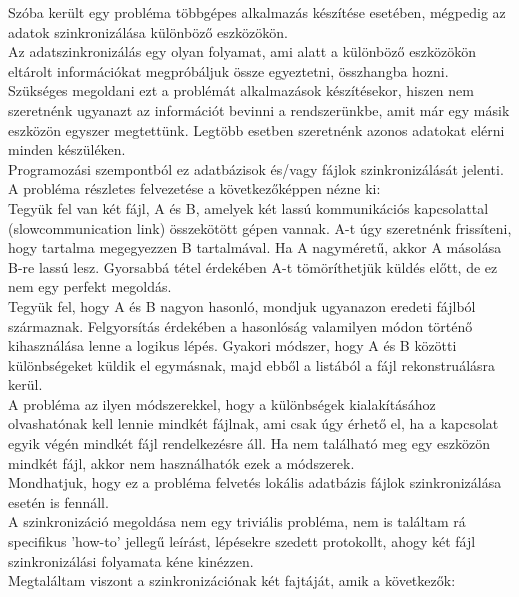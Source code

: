 \newpage {}

Szóba került egy probléma többgépes alkalmazás készítése esetében, mégpedig az adatok szinkronizálása különböző eszközökön.
\vspace{5pt} \\ Az adatszinkronizálás egy olyan folyamat, ami alatt a különböző eszközökön eltárolt információkat megpróbáljuk össze egyeztetni, összhangba hozni.
\vspace{5pt} \\Szükséges megoldani ezt a problémát alkalmazások készítésekor, hiszen nem szeretnénk ugyanazt az információt bevinni a rendszerünkbe, amit már egy másik eszközön egyszer megtettünk. Legtöbb esetben szeretnénk azonos adatokat elérni minden készüléken.
\vspace{5pt} \\Programozási szempontból ez adatbázisok és/vagy fájlok szinkronizálását jelenti.
\vspace{15pt} \\ A probléma részletes felvezetése a következőképpen nézne ki:
\vspace{5pt} \\ \indent Tegyük fel van két fájl, A és B, amelyek két lassú kommunikációs kapcsolattal (slowcommunication link) összekötött gépen vannak. A-t úgy szeretnénk frissíteni, hogy tartalma megegyezzen B tartalmával.  Ha A nagyméretű, akkor A másolása B-re lassú lesz. Gyorsabbá tétel érdekében A-t tömöríthetjük küldés előtt, de ez nem egy perfekt megoldás.
\vspace{5pt} \\ Tegyük fel, hogy A és B nagyon hasonló, mondjuk ugyanazon eredeti fájlból származnak. Felgyorsítás érdekében a hasonlóság valamilyen módon történő kihasználása lenne a logikus lépés. Gyakori módszer, hogy A és B közötti különbségeket küldik el egymásnak, majd ebből a listából a fájl rekonstruálásra kerül. 
\vspace{5pt} \\ A probléma az ilyen módszerekkel, hogy a különbségek kialakításához olvashatónak kell lennie mindkét fájlnak, ami csak úgy érhető el, ha a kapcsolat egyik végén mindkét fájl rendelkezésre áll. Ha nem található meg egy eszközön mindkét fájl, akkor nem használhatók ezek a módszerek.
\vspace{5pt} \\ Mondhatjuk, hogy ez a probléma felvetés lokális adatbázis fájlok szinkronizálása esetén is fennáll.
\vspace{15pt} \\ A szinkronizáció megoldása nem egy triviális probléma, nem is találtam rá specifikus 'how-to' jellegű leírást, lépésekre szedett protokollt, ahogy két fájl szinkronizálási folyamata kéne kinézzen.
\\ Megtaláltam viszont a szinkronizációnak két fajtáját, amik a következők:

